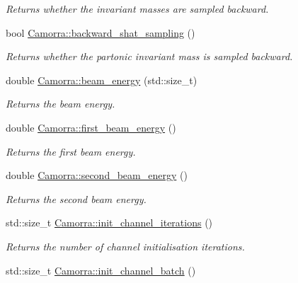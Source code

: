 \begin{DoxyCompactItemize}
\begin{DoxyCompactList}\small\item\em Returns whether the invariant masses are sampled backward. \end{DoxyCompactList}\item 
\hypertarget{a00800_afaf1ceb8d83f39ae2599190e77311ddd}{
bool \hyperlink{a00800_afaf1ceb8d83f39ae2599190e77311ddd}{Camorra::backward\_\-shat\_\-sampling} ()}
\label{a00800_afaf1ceb8d83f39ae2599190e77311ddd}

\begin{DoxyCompactList}\small\item\em Returns whether the partonic invariant mass is sampled backward. \end{DoxyCompactList}\item 
\hypertarget{a00800_a8428a1dc1126b5c64d4c2b3eac982a08}{
double \hyperlink{a00800_a8428a1dc1126b5c64d4c2b3eac982a08}{Camorra::beam\_\-energy} (std::size\_\-t)}
\label{a00800_a8428a1dc1126b5c64d4c2b3eac982a08}

\begin{DoxyCompactList}\small\item\em Returns the beam energy. \end{DoxyCompactList}\item 
\hypertarget{a00800_ae37732a0d7d978fed452febc85956ba6}{
double \hyperlink{a00800_ae37732a0d7d978fed452febc85956ba6}{Camorra::first\_\-beam\_\-energy} ()}
\label{a00800_ae37732a0d7d978fed452febc85956ba6}

\begin{DoxyCompactList}\small\item\em Returns the first beam energy. \end{DoxyCompactList}\item 
\hypertarget{a00800_a2a0730cc45130987f9f09f378e63fc8d}{
double \hyperlink{a00800_a2a0730cc45130987f9f09f378e63fc8d}{Camorra::second\_\-beam\_\-energy} ()}
\label{a00800_a2a0730cc45130987f9f09f378e63fc8d}

\begin{DoxyCompactList}\small\item\em Returns the second beam energy. \end{DoxyCompactList}\item 
\hypertarget{a00800_a1ea95549577a97313b586b08daf9d6e1}{
std::size\_\-t \hyperlink{a00800_a1ea95549577a97313b586b08daf9d6e1}{Camorra::init\_\-channel\_\-iterations} ()}
\label{a00800_a1ea95549577a97313b586b08daf9d6e1}

\begin{DoxyCompactList}\small\item\em Returns the number of channel initialisation iterations. \end{DoxyCompactList}\item 
\hypertarget{a00800_a55c0fe1561bc9cf86d32b2e0619af248}{
std::size\_\-t \hyperlink{a00800_a55c0fe1561bc9cf86d32b2e0619af248}{Camorra::init\_\-channel\_\-batch} ()}
\label{a00800_a55c0fe1561bc9cf86d32b2e0619af248}


\end{DoxyCompactItemize}

